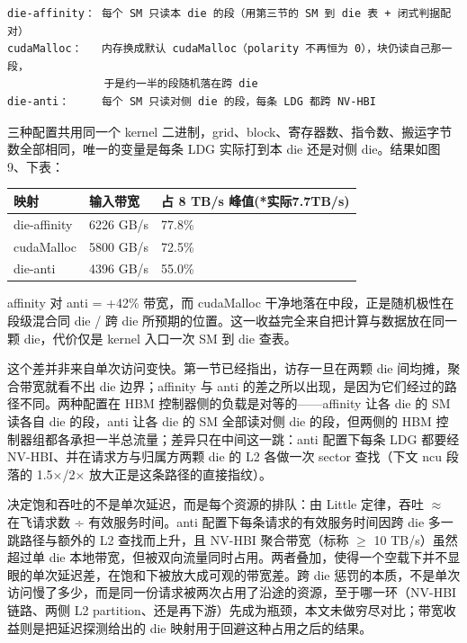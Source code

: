 \begin{lstlisting}
die-affinity： 每个 SM 只读本 die 的段（用第三节的 SM 到 die 表 + 闭式判据配对）
cudaMalloc：   内存换成默认 cudaMalloc（polarity 不再恒为 0），块仍读自己那一段，
               于是约一半的段随机落在跨 die
die-anti：     每个 SM 只读对侧 die 的段，每条 LDG 都跨 NV-HBI
\end{lstlisting}

三种配置共用同一个 kernel 二进制，grid、block、寄存器数、指令数、搬运字节数全部相同，唯一的变量是每条 LDG 实际打到本 die 还是对侧 die。结果如图 9、下表：

\begin{table}[htbp]
\centering
\begin{tabular}{lll}
\toprule
映射 & 输入带宽 & 占 8 TB/s 峰值(*实际7.7TB/s) \\
\midrule
die-affinity & 6226 GB/s & 77.8\% \\
cudaMalloc & 5800 GB/s & 72.5\% \\
die-anti & 4396 GB/s & 55.0\% \\
\bottomrule
\end{tabular}
\end{table}

affinity 对 anti = +42\% 带宽，而 cudaMalloc 干净地落在中段，正是随机极性在段级混合同 die / 跨 die 所预期的位置。这一收益完全来自把计算与数据放在同一颗 die，代价仅是 kernel 入口一次 SM 到 die 查表。

这个差并非来自单次访问变快。第一节已经指出，访存一旦在两颗 die 间均摊，聚合带宽就看不出 die 边界；affinity 与 anti 的差之所以出现，是因为它们经过的路径不同。两种配置在 HBM 控制器侧的负载是对等的——affinity 让各 die 的 SM 读各自 die 的段，anti 让各 die 的 SM 全部读对侧 die 的段，但两侧的 HBM 控制器组都各承担一半总流量；差异只在中间这一跳：anti 配置下每条 LDG 都要经 NV-HBI、并在请求方与归属方两颗 die 的 L2 各做一次 sector 查找（下文 ncu 段落的 1.5$\times$/2$\times$ 放大正是这条路径的直接指纹）。

决定饱和吞吐的不是单次延迟，而是每个资源的排队：由 Little 定律，吞吐 $\approx$ 在飞请求数 ÷ 有效服务时间。anti 配置下每条请求的有效服务时间因跨 die 多一跳路径与额外的 L2 查找而上升，且 NV-HBI 聚合带宽（标称 $\geq$ 10 TB/s）虽然超过单 die 本地带宽，但被双向流量同时占用。两者叠加，使得一个空载下并不显眼的单次延迟差，在饱和下被放大成可观的带宽差。跨 die 惩罚的本质，不是单次访问慢了多少，而是同一份请求被两次占用了沿途的资源，至于哪一环（NV-HBI 链路、两侧 L2 partition、还是再下游）先成为瓶颈，本文未做穷尽对比；带宽收益则是把延迟探测给出的 die 映射用于回避这种占用之后的结果。

